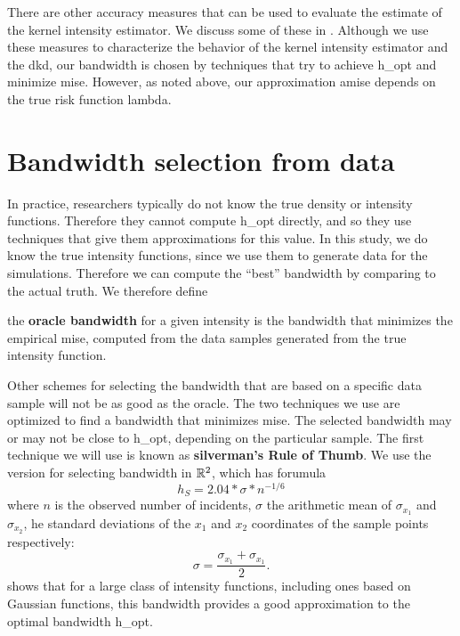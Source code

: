There are other accuracy measures that can be used to evaluate the estimate of the \gls{kernel intensity estimator}.
We discuss some of these in .
Although we use these measures to characterize the behavior of the \gls{kernel intensity estimator} and the \gls{dkd},
our bandwidth is chosen by techniques that try to achieve \gls{h_opt} and minimize \gls{mise}.
However, as noted above,
our approximation \gls{amise} depends on the true risk function \gls{lambda}.


\section{Bandwidth selection from data}
\label{sec:theory:bandwidthselection}

In practice,
researchers typically do not know the true density or intensity functions.
Therefore they cannot compute \gls{h_opt} directly,
and so they use techniques that give them approximations for this value.
In this study,
we do know the true intensity functions,
since we use them to generate data for the simulations.
Therefore we can compute the ``best'' bandwidth by comparing to the actual truth.
We therefore define
\begin{defn}
    the \textbf{\gls{oracle bandwidth}} for a given \gls{intensity} is the bandwidth that minimizes the empirical \gls{mise},
    computed from the data samples generated from the true \gls{intensity} function.
\end{defn}
Other schemes for selecting the bandwidth that are based on a specific data sample will not be as good as the \gls{oracle}.
The two techniques we use are optimized to find a bandwidth that minimizes \gls{mise}.
The selected bandwidth may or may not be close to \gls{h_opt},
depending on the particular sample.
The first technique we will use is known as \textbf{\Gls{silverman}'s Rule of Thumb}.
We use the version for selecting bandwidth in $\mathbb{R}^2$,
which has forumula
\begin{equation}
    \label{eq:silverman}
    h_S = 2.04 * \sigma * n^{-1/6}%
\end{equation}
where $n$ is the observed number of incidents,
$\sigma$ the arithmetic mean of $\sigma_{x_1}$ and $\sigma_{x_2}$,
he standard deviations of the $x_1$ and $x_2$ coordinates of the sample points respectively:
\begin{equation}
    \sigma = \frac{\sigma_{x_1} + \sigma_{x_1}}{2} \text{.}
\end{equation}
\citet{silverman1986density} shows that for a large class of intensity functions,
including ones based on Gaussian functions,
this bandwidth provides a good approximation to the optimal bandwidth \gls{h_opt}. 


